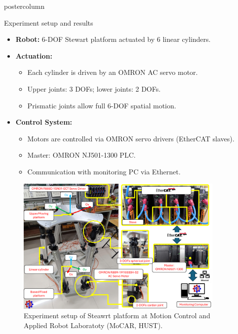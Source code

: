 \documentclass{beamer}
\begin{document}
\begin{frame}
\begin{columns}
\begin{column}{.57\textwidth}
\begin{beamercolorbox}[center]{postercolumn}
\begin{minipage}{.98\textwidth}
{					\begin{myblock}{Experiment setup and results}
						\begin{itemize}
							\item \textbf{Robot:} 6-DOF Stewart platform actuated by 6 linear cylinders.
							\item \textbf{Actuation:}
							\begin{itemize}
								\item Each cylinder is driven by an OMRON AC servo motor.
								\item Upper joints: 3 DOFs; lower joints: 2 DOFs.
								\item Prismatic joints allow full 6-DOF spatial motion.
							\end{itemize}
							\item \textbf{Control System:}
							\begin{itemize}
								\item Motors are controlled via OMRON servo drivers (EtherCAT slaves).
								\item Master: OMRON NJ501-1300 PLC.
								\item Communication with monitoring PC via Ethernet.
							\end{itemize}
						\end{itemize}
						\vspace{1em}
						\begin{figure}
							\begin{minipage}{\textwidth}
								\centering\includegraphics[width=0.9\textwidth]{img/experiment_setup.pdf}
								\caption{Experiment setup of Steawrt platform at Motion Control and Applied Robot Laboratoty (MoCAR, HUST).}
							\end{minipage}
						\end{figure}

\end{myblock}}
\end{minipage}
\end{beamercolorbox}
\end{column}
\end{columns}
\end{frame}
\end{document}
